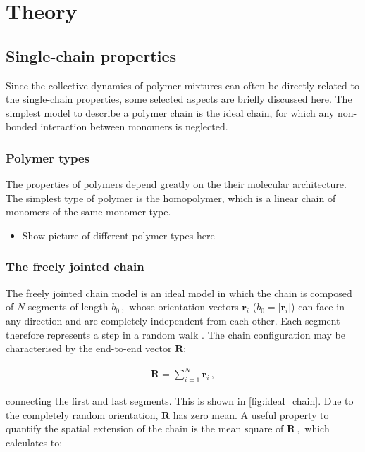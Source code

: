 \documentclass[bachelor,       %
               oneside,        %
               BCOR10mm,       %
               ngerman, english %
               ]{GAUBM}
\begin{document}
\chapter{Theory}

\section{Single-chain properties}

Since the collective dynamics of polymer mixtures can often be directly related to the single-chain properties, some selected aspects are briefly discussed here. The simplest model to describe a polymer chain is the ideal chain, for which any non-bonded interaction between monomers is neglected.

\subsection{Polymer types}

The properties of polymers depend greatly on the their molecular architecture. The simplest type of polymer is the homopolymer, which is a linear chain of monomers of the same monomer type. 

\begin{itemize}
    \item Show picture of different polymer types here
\end{itemize}

\subsection{The freely jointed chain}

The freely jointed chain model is an ideal model in which the chain is composed of $N$ segments of length $b_0\,,$ whose orientation vectors $\mathbf r_i$ ($b_0=|\mathbf r_i|$) can face in any direction and are completely independent from each other. Each segment therefore represents a step in a random walk \cite{Doi_edwards}. The chain configuration may be characterised by the end-to-end vector $\mathbf R$:

\begin{align}
    \mathbf R=\sum_{i=1}^{N}\mathbf r_i\,,
\end{align}

connecting the first and last segments. This is shown in \autoref{fig:ideal_chain}. Due to the completely random orientation, $\mathbf R$ has zero mean. A useful property to quantify the spatial extension of the chain is the mean square of $\mathbf R\,,$ which calculates to:
\end{document}
